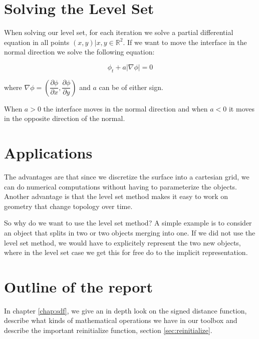 
\section*{Solving the Level Set}\label{sec:intro:solve} 

When solving our level set, for each iteration we solve a partial differential equation in all points $(x,y) | x,y \in \mathbb{R}^{2}$. If we want to move the interface in the normal direction we solve the following equation:

\begin{equation}
\label{introduction:eq:levelsetndirection}
  \phi_{t} + a|\nabla \phi| = 0
\end{equation}\label{eq:normMove}

where $\nabla \phi = (\dfrac{\partial \phi}{\partial x}, \dfrac{\partial \phi}{\partial y})$  and $a$ can be of either sign. 

When $a > 0$ the interface moves in the normal direction and when $a < 0$ it moves in the opposite direction of the normal.


\section*{Applications}

The advantages are that since we discretize the surface into a cartesian grid, we can do numerical computations without having to parameterize the objects. Another advantage is that the level set method makes it easy to work on geometry that change topology over time.


So why do we want to use the level set method? A simple example is to consider an object that splits in two or two objects merging into one. If we did not use the level set method, we would have to explicitely represent the two new objects, where in the level set case we get this for free do to the implicit representation.


\newpage

\section*{Outline of the report}

In chapter \vref{chap:sdf}, we give an in depth look on the signed distance function, describe what kinds of mathematical operations we have in our toolbox and describe the important reinitialize function, section \vref{sec:reinitialize}.

